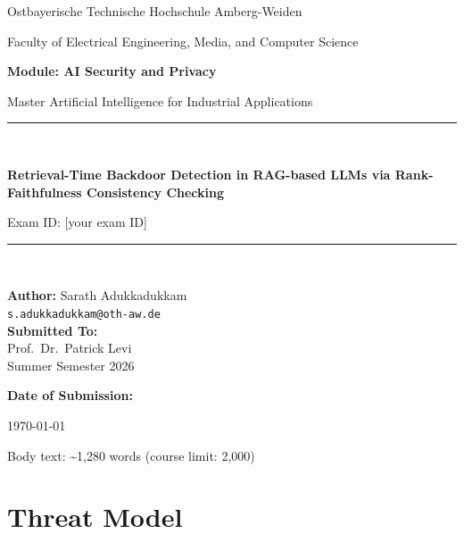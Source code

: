 \documentclass[11pt,a4paper]{article}
\makeatletter
\newcommand{\Title}{Retrieval-Time Backdoor Detection in RAG-based LLMs via Rank-Faithfulness Consistency Checking}
\newcommand{\Author}{Sarath Adukkadukkam}
\newcommand{\Email}{s.adukkadukkam@oth-aw.de}
\newcommand{\ExamID}{[your exam ID]}          %
\newcommand{\Module}{AI Security and Privacy}
\newcommand{\Programme}{Master Artificial Intelligence for Industrial Applications}
\newcommand{\Supervisor}{Prof.\ Dr.\ Patrick Levi}
\newcommand{\Semester}{Summer Semester 2026}
\makeatother
\begin{document}
\begin{titlepage}
\centering
\vspace*{1.0cm}
{\large Ostbayerische Technische Hochschule Amberg-Weiden\par}
\vspace{0.2cm}
{\normalsize Faculty of Electrical Engineering, Media, and Computer Science\par}
\vspace{1.8cm}
{\Large\bfseries Module: \Module\par}
\vspace{0.25cm}
{\normalsize \Programme\par}
\vspace{1.8cm}
\rule{\linewidth}{0.5pt}\\[0.5cm]
{\LARGE\bfseries \Title\par}
\vspace{0.5cm}
{\normalsize Exam ID: \ExamID\par}
\rule{\linewidth}{0.5pt}\\[2.2cm]
\begin{flushleft}
\hspace{0.06\linewidth}\textbf{Author:} \Author\\[0.15cm]
\hspace{0.06\linewidth}\texttt{\Email}\\[1.0cm]
\hspace{0.06\linewidth}\textbf{Submitted To:}\\[0.1cm]
\hspace{0.06\linewidth}\Supervisor\\[0.1cm]
\hspace{0.06\linewidth}\Semester
\end{flushleft}
\vfill
{\bfseries Date of Submission:}\\[0.1cm]
{\normalsize \today\par}
\vspace{0.6cm}
{\small Body text: \textasciitilde1{,}280 words (course limit: 2{,}000)\par}
\end{titlepage}

\tableofcontents
\thispagestyle{empty}
\newpage
\setcounter{page}{1}

\section{Threat Model}
\end{document}
